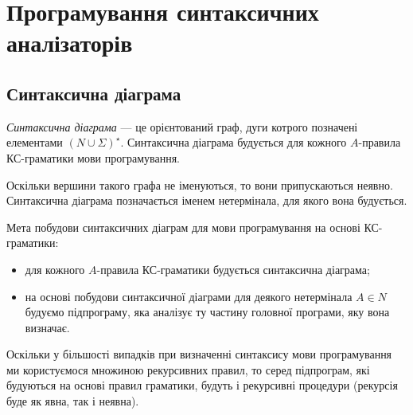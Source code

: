 \setcounter{section}{10}

\section{Програмування синтаксичних \allowbreak а\-на\-лі\-за\-то\-рів}

\subsection{Синтаксична діаграма}

\textit{Синтаксична діаграма} --- це орієнтований граф, дуги котрого позначені елементами $(N \cup \Sigma)^\star$. Синтаксична діаграма будується для кожного $A$-правила КС-граматики мови програмування. \medskip

Оскільки вершини такого графа не іменуються, то вони припускаються неявно. Синтаксична діаграма позначається іменем нетермінала, для якого вона будується. \medskip

Мета побудови синтаксичних діаграм для мови програмування на основі КС-граматики:
\begin{itemize}
	\item для кожного $A$-правила КС-граматики будується синтаксична діаграма;
	\item на основі побудови синтаксичної діаграми для деякого нетермінала $A \in N$ будуємо підпрограму, яка аналізує ту частину головної програми, яку вона визначає.
\end{itemize}

Оскільки у більшості випадків при визначенні синтаксису мови програмування ми користуємося множиною рекурсивних правил, то серед підпрограм, які будуються на основі правил граматики, будуть і рекурсивні процедури (рекурсія буде як явна, так і неявна). \medskip

